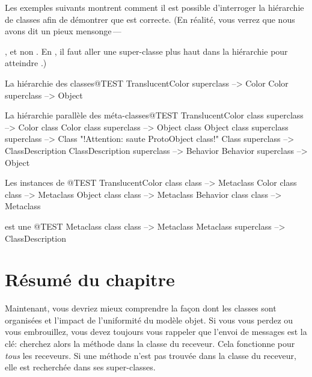 \documentclass[a4paper,10pt,twoside]{book}
\begin{document}
Les exemples suivants montrent comment il est possible d'interroger la hiérarchie de classes afin de démontrer que  est correcte.
(En réalité, vous verrez que nous avons dit un pieux mensonge\,---\, {, et non . En \sq, il faut aller une super-classe plus haut dans la hiérarchie pour atteindre .)

\begin{example}{La hiérarchie des classes}{@TEST}
TranslucentColor superclass			-->		Color
Color superclass							-->		Object
\end{example}

\begin{example}{La hi{\'e}rarchie parall{\`e}le des méta-classes}{@TEST}
TranslucentColor class superclass   --> Color class
Color class superclass                     --> Object class
Object class superclass superclass --> Class    "!Attention: saute ProtoObject class!"
Class superclass                              --> ClassDescription
ClassDescription superclass            --> Behavior
Behavior superclass                         --> Object
\end{example}

\begin{example}{Les instances de }{@TEST}
TranslucentColor class class --> Metaclass
Color class class                   --> Metaclass
Object class class                 --> Metaclass
Behavior class class              --> Metaclass
\end{example}

\begin{example}{ est une }{@TEST}
Metaclass class class --> Metaclass
Metaclass superclass --> ClassDescription
\end{example}

\section{Résumé du chapitre}

Maintenant, vous devriez mieux comprendre la façon dont les classes sont organisées et l'impact de l'uniformité du modèle objet.
Si vous vous perdez ou vous embrouillez, vous devez toujours vous rappeler que l'envoi de messages est la clé: cherchez alors la méthode dans la classe du receveur.
Cela fonctionne pour \emph{tous} les receveurs.
Si une méthode n'est pas trouvée dans la classe du receveur, elle est recherchée dans ses super-classes.


}
\end{document}
